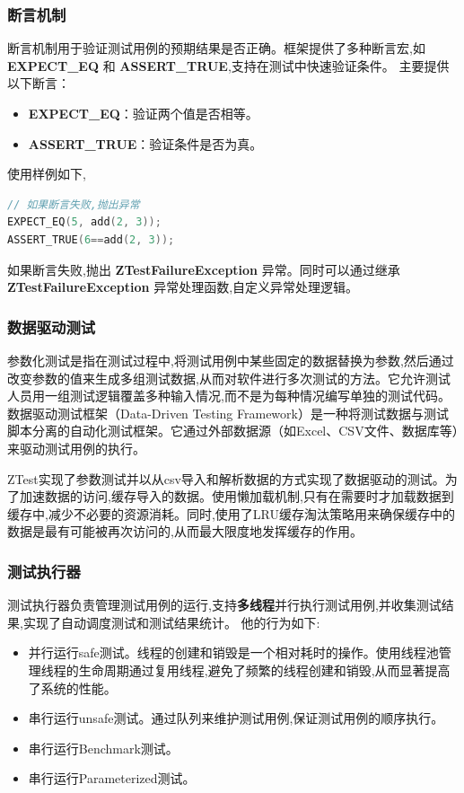 \documentclass{article}
\begin{document}
\subsubsection{断言机制}
断言机制用于验证测试用例的预期结果是否正确。框架提供了多种断言宏,如 \textbf{EXPECT\_EQ} 和 \textbf{ASSERT\_TRUE},支持在测试中快速验证条件。
主要提供以下断言：
\begin{itemize}
    \item \textbf{EXPECT\_EQ}：验证两个值是否相等。
    \item \textbf{ASSERT\_TRUE}：验证条件是否为真。
\end{itemize}
使用样例如下,
\begin{lstlisting}[language=C++]
// 如果断言失败,抛出异常
EXPECT_EQ(5, add(2, 3));
ASSERT_TRUE(6==add(2, 3));
\end{lstlisting}

如果断言失败,抛出 \textbf{ZTestFailureException} 异常。同时可以通过继承 \textbf{ZTestFailureException} 异常处理函数,自定义异常处理逻辑。
\subsubsection{数据驱动测试}
参数化测试是指在测试过程中,将测试用例中某些固定的数据替换为参数,然后通过改变参数的值来生成多组测试数据,从而对软件进行多次测试的方法。它允许测试人员用一组测试逻辑覆盖多种输入情况,而不是为每种情况编写单独的测试代码。
数据驱动测试框架（Data-Driven Testing Framework）是一种将测试数据与测试脚本分离的自动化测试框架。它通过外部数据源（如Excel、CSV文件、数据库等）来驱动测试用例的执行。

ZTest实现了参数测试并以从csv导入和解析数据的方式实现了数据驱动的测试。为了加速数据的访问,缓存导入的数据。使用懒加载机制,只有在需要时才加载数据到缓存中,减少不必要的资源消耗。同时,使用了LRU缓存淘汰策略用来确保缓存中的数据是最有可能被再次访问的,从而最大限度地发挥缓存的作用。

\subsubsection{测试执行器}
测试执行器负责管理测试用例的运行,支持\textbf{多线程}并行执行测试用例,并收集测试结果,实现了自动调度测试和测试结果统计。
他的行为如下:
\begin{itemize}
    \item 并行运行safe测试。线程的创建和销毁是一个相对耗时的操作。使用线程池管理线程的生命周期通过复用线程,避免了频繁的线程创建和销毁,从而显著提高了系统的性能。
    \item 串行运行unsafe测试。通过队列来维护测试用例,保证测试用例的顺序执行。
    \item 串行运行Benchmark测试。
    \item 串行运行Parameterized测试。
\end{itemize}
\end{document}
